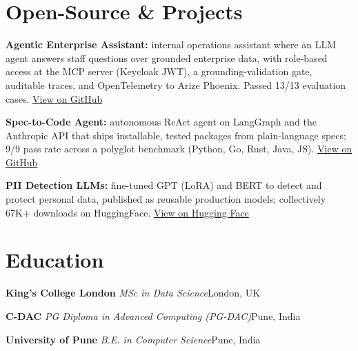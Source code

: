 \documentclass[10pt,a4paper]{article}
\newcommand{\sep}{\,\textcolor{accent!60}{\textbar}\,}
\begin{document}
\section{Open-Source \& Projects}
\begin{tight}
  \item \textbf{Agentic Enterprise Assistant:} internal operations assistant where an LLM agent answers staff questions over grounded enterprise data, with role-based access at the MCP server (Keycloak JWT), a grounding-validation gate, auditable traces, and OpenTelemetry to Arize Phoenix. Passed 13/13 evaluation cases. \href{https://github.com/abhijeetscode/Agentic-Enterprise-Assistant}{View on GitHub}
  \item \textbf{Spec-to-Code Agent:} autonomous ReAct agent on LangGraph and the Anthropic API that ships installable, tested packages from plain-language specs; 9/9 pass rate across a polyglot benchmark (Python, Go, Rust, Java, JS). \href{https://github.com/abhijeetscode/Spec-to-Code-Agent}{View on GitHub}
  \item \textbf{PII Detection LLMs:} fine-tuned GPT (LoRA) and BERT to detect and protect personal data, published as reusable production models; collectively 67K+ downloads on HuggingFace. \href{https://huggingface.co/ab-ai/pii_model}{View on Hugging Face}
\end{tight}

\section{Education}
{\color{company}\bfseries King's College London}\sep{\itshape MSc in Data Science}\hfill {\color{muted}London, UK}\par\vspace{1pt}
{\color{company}\bfseries C-DAC}\sep{\itshape PG Diploma in Advanced Computing (PG-DAC)}\hfill {\color{muted}Pune, India}\par\vspace{1pt}
{\color{company}\bfseries University of Pune}\sep{\itshape B.E. in Computer Science}\hfill {\color{muted}Pune, India}\par
\end{document}
